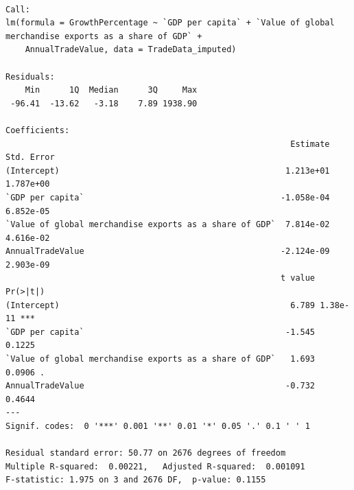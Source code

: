 \documentclass[
  10pt,
]{article}
\newenvironment{Shaded}{\begin{snugshade}}{\end{snugshade}}
\newcommand{\AttributeTok}[1]{\textcolor[rgb]{0.40,0.45,0.13}{#1}}
\newcommand{\CommentTok}[1]{\textcolor[rgb]{0.37,0.37,0.37}{#1}}
\newcommand{\DecValTok}[1]{\textcolor[rgb]{0.68,0.00,0.00}{#1}}
\newcommand{\FunctionTok}[1]{\textcolor[rgb]{0.28,0.35,0.67}{#1}}
\newcommand{\NormalTok}[1]{\textcolor[rgb]{0.00,0.23,0.31}{#1}}
\newcommand{\OtherTok}[1]{\textcolor[rgb]{0.00,0.23,0.31}{#1}}
\newcommand{\SpecialCharTok}[1]{\textcolor[rgb]{0.37,0.37,0.37}{#1}}
\newcommand{\StringTok}[1]{\textcolor[rgb]{0.13,0.47,0.30}{#1}}
\begin{document}
\begin{verbatim}

Call:
lm(formula = GrowthPercentage ~ `GDP per capita` + `Value of global merchandise exports as a share of GDP` + 
    AnnualTradeValue, data = TradeData_imputed)

Residuals:
    Min      1Q  Median      3Q     Max 
 -96.41  -13.62   -3.18    7.89 1938.90 

Coefficients:
                                                          Estimate Std. Error
(Intercept)                                              1.213e+01  1.787e+00
`GDP per capita`                                        -1.058e-04  6.852e-05
`Value of global merchandise exports as a share of GDP`  7.814e-02  4.616e-02
AnnualTradeValue                                        -2.124e-09  2.903e-09
                                                        t value Pr(>|t|)    
(Intercept)                                               6.789 1.38e-11 ***
`GDP per capita`                                         -1.545   0.1225    
`Value of global merchandise exports as a share of GDP`   1.693   0.0906 .  
AnnualTradeValue                                         -0.732   0.4644    
---
Signif. codes:  0 '***' 0.001 '**' 0.01 '*' 0.05 '.' 0.1 ' ' 1

Residual standard error: 50.77 on 2676 degrees of freedom
Multiple R-squared:  0.00221,   Adjusted R-squared:  0.001091 
F-statistic: 1.975 on 3 and 2676 DF,  p-value: 0.1155
\end{verbatim}

\begin{Shaded}
\end{Shaded}
\end{document}
